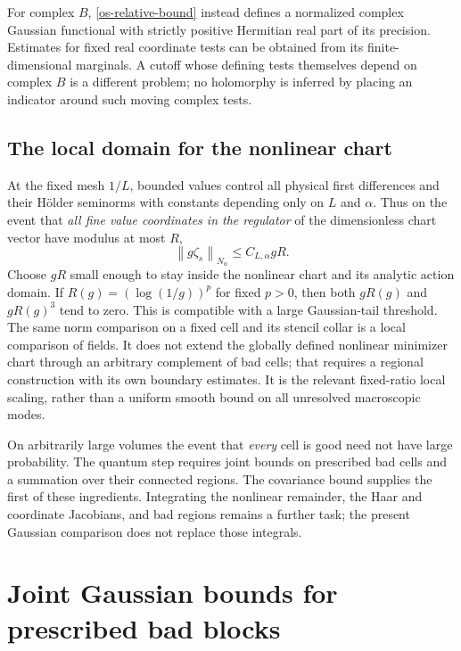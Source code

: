 \documentclass[11pt]{article}
\theoremstyle{remark}
\newcommand{\norm}[1]{\left\|#1\right\|}
\begin{document}
For complex $B$, \eqref{os-relative-bound} instead defines a
normalized complex Gaussian functional with strictly positive
Hermitian real part of its precision. Estimates for fixed real
coordinate tests can be obtained from its finite-dimensional
marginals. A cutoff whose defining tests themselves depend on
complex $B$ is a different problem; no holomorphy is inferred
by placing an indicator around such moving complex tests.

\subsection{The local domain for the nonlinear chart}
\label{os-chart-domain}

At the fixed mesh $1/L$, bounded values control all physical
first differences and their H\"older seminorms with constants
depending only on $L$ and $\alpha$. Thus on the event that
\emph{all fine value coordinates in the regulator} of the
dimensionless chart vector have modulus at most $R$,
\begin{equation}\label{os-domain-radius}
 \norm{g\zeta_s}_{N_\alpha}\le C_{L,\alpha}gR.
\end{equation}
Choose $gR$ small enough to stay inside the nonlinear chart
and its analytic action domain. If $R(g)=(\log(1/g))^p$
for fixed $p>0$, then both $gR(g)$ and $gR(g)^3$ tend to
zero. This is compatible with a large Gaussian-tail threshold.
The same norm comparison on a fixed cell and its stencil
collar is a local comparison of fields. It does not extend
the globally defined nonlinear minimizer chart through an
arbitrary complement of bad cells; that requires a regional
construction with its own boundary estimates.
It is the relevant fixed-ratio local scaling, rather than
a uniform smooth bound on all unresolved macroscopic modes.

On arbitrarily large volumes the event that \emph{every} cell
is good need not have large probability. The quantum step
requires joint bounds on prescribed bad cells and a summation
over their connected regions. The covariance bound supplies
the first of these ingredients. Integrating the nonlinear
remainder, the Haar and coordinate Jacobians, and bad regions
remains a further task; the present Gaussian comparison does
not replace those integrals.


\section{Joint Gaussian bounds for prescribed bad blocks}
\label{jt-section}
\end{document}
